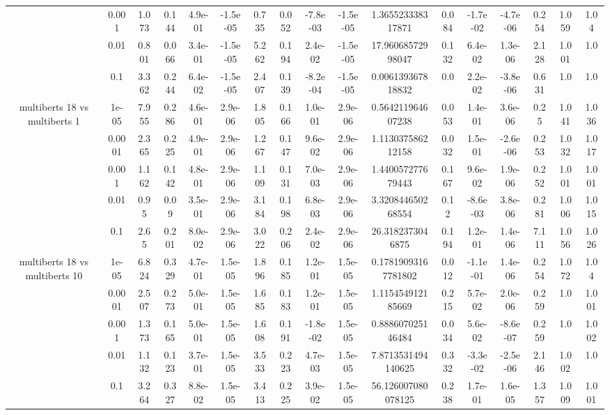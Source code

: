 \begin{tabular}{|c|c|c|c|c|c|c|c|c|c|c|c|c|c|c|c|c|}
 & 0.001 & 1.073 & 0.144 & 4.9e-01 & -1.5e-05 & 0.735 & 0.052 & -7.8e-03 & -1.5e-05 & 1.365523338317871 & 0.084 & -1.7e-02 & -4.7e-06 & 0.254 & 1.059 & 1.04 \\
 & 0.01 & 0.801 & 0.066 & 3.4e-01 & -1.5e-05 & 5.262 & 0.194 & 2.4e-02 & -1.5e-05 & 17.96068572998047 & 0.132 & 6.4e-02 & 1.3e-06 & 2.128 & 1.001 & 1.0 \\
 & 0.1 & 3.362 & 0.244 & 6.4e-02 & -1.5e-05 & 2.407 & 0.139 & -8.2e-04 & -1.5e-05 & 0.006139367818832 & 0.0 & 2.2e-02 & -3.8e-06 & 0.631 & 1.0 & 1.0 \\
\hline
\multirow{5}{*}{multiberts 18 vs multiberts 1} & 1e-05 & 7.955 & 0.286 & 4.6e-01 & 2.9e-06 & 1.805 & 0.166 & 1.0e-01 & 2.9e-06 & 0.564211964607238 & 0.053 & 1.4e-01 & 3.6e-06 & 0.25 & 1.041 & 1.036 \\
 & 0.0001 & 2.365 & 0.225 & 4.9e-01 & 2.9e-06 & 1.267 & 0.147 & 9.6e-02 & 2.9e-06 & 1.113037586212158 & 0.032 & 1.5e-01 & -2.6e-06 & 0.253 & 1.032 & 1.017 \\
 & 0.001 & 1.162 & 0.142 & 4.8e-01 & 2.9e-06 & 1.109 & 0.131 & 7.0e-03 & 2.9e-06 & 1.440057277679443 & 0.167 & 9.6e-02 & 1.9e-06 & 0.252 & 1.001 & 1.001 \\
 & 0.01 & 0.95 & 0.09 & 3.5e-01 & 2.9e-06 & 3.184 & 0.198 & 6.8e-03 & 2.9e-06 & 3.320844650268554 & 0.12 & -8.6e-03 & 3.8e-06 & 0.281 & 1.006 & 1.015 \\
 & 0.1 & 2.65 & 0.201 & 8.0e-02 & 2.9e-06 & 3.022 & 0.206 & 2.4e-02 & 2.9e-06 & 26.3182373046875 & 0.194 & 1.2e-01 & 1.4e-06 & 7.111 & 1.056 & 1.026 \\
\hline
\multirow{5}{*}{multiberts 18 vs multiberts 10} & 1e-05 & 6.824 & 0.329 & 4.7e-01 & 1.5e-05 & 1.896 & 0.185 & 1.2e-01 & 1.5e-05 & 0.17819093167781802 & 0.012 & -1.1e-01 & 1.4e-06 & 0.254 & 1.072 & 1.04 \\
 & 0.0001 & 2.507 & 0.273 & 5.0e-01 & 1.5e-05 & 1.685 & 0.183 & 1.2e-01 & 1.5e-05 & 1.115454912185669 & 0.215 & 5.7e-02 & 2.0e-06 & 0.259 & 1.0 & 1.001 \\
 & 0.001 & 1.373 & 0.165 & 5.0e-01 & 1.5e-05 & 1.608 & 0.191 & -1.8e-02 & 1.5e-05 & 0.888607025146484 & 0.034 & 5.6e-02 & -8.6e-07 & 0.259 & 1.0 & 1.002 \\
 & 0.01 & 1.132 & 0.123 & 3.7e-01 & 1.5e-05 & 3.533 & 0.223 & 4.7e-03 & 1.5e-05 & 7.8713531494140625 & 0.332 & -3.3e-02 & -2.5e-06 & 2.146 & 1.002 & 1.0 \\
 & 0.1 & 3.264 & 0.327 & 8.8e-02 & 1.5e-05 & 3.413 & 0.225 & 3.9e-02 & 1.5e-05 & 56.126007080078125 & 0.238 & 1.7e-01 & 1.6e-05 & 1.357 & 1.009 & 1.001 \\

\end{tabular}
